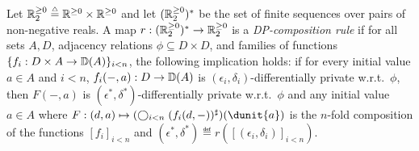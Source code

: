 \documentclass{lmcs}
\begin{document}
\begin{defi} \label{d:comp:rule}
  Let $\mathbb{R}^{\geq 0}_2 \mathrel{\stackrel{\scriptscriptstyle \triangle}{=}} \mathbb{R}^{\geq 0} \times \mathbb{R}^{\geq 0}$ and let
  $(\mathbb{R}^{\geq 0}_2)^*$ be the set of finite sequences over pairs of non-negative
  reals. A map $r : (\mathbb{R}^{\geq 0}_2)^* \to \mathbb{R}^{\geq 0}_2$ is a
  \emph{DP-composition rule} if for all sets $A, D$, adjacency relations $\phi
  \subseteq D \times D$, and families of functions $\{ f_i : D \times A \to
  {\mathbb{D}}(A) \}_{i < n}$, the following implication holds: if for every initial
  value $a \in A$ and $i < n$, $f_i(-,a) : D \to {\mathbb{D}}(A)$ is $(\epsilon_i,
  \delta_i)$-differentially private w.r.t.\ $\phi$, then $F(-,a)$ is
  $(\epsilon^*, \delta^*)$-differentially private w.r.t.\ $\phi$ and any initial
  value $a \in A$ where $F : (d, a) \mapsto ( \bigcirc_{i < n}
  \lift{(f_i(d,-))})(\dunit{a})$ is the $n$-fold composition of the functions
  $[f_i]_{i<n}$ and $(\epsilon^*, \delta^*) \eqdef r([(\epsilon_i, \delta_i)]_{i < n})$.
\end{defi}
\end{document}
